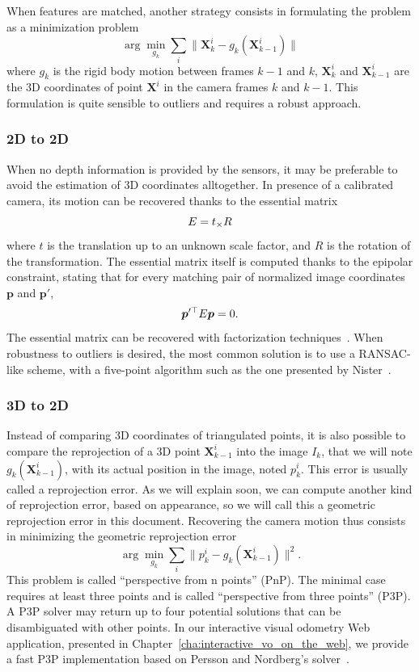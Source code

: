 When features are matched, another strategy consists in
formulating the problem as a minimization problem
\[
	\arg \min_{g_k} \sum_{i} \| \bm{X}_k^i - g_k(\bm{X}_{k-1}^i) \|
\]
where $g_k$ is the rigid body motion between frames $k-1$ and $k$,
$\bm{X}_k^i$ and $\bm{X}_{k-1}^i$ are the 3D coordinates of point $\bm{X}^i$
in the camera frames $k$ and $k-1$.
This formulation is quite sensible to outliers and requires a robust approach.

\subsubsection{2D to 2D}%
\label{ssub:2d_to_2d}

When no depth information is provided by the sensors,
it may be preferable to avoid the estimation of 3D coordinates alltogether.
In presence of a calibrated camera, its motion can be recovered
thanks to the essential matrix
\[
	E = {t}_{\times}R
\]
where $t$ is the translation up to an unknown scale factor,
and $R$ is the rotation of the transformation.
The essential matrix itself is computed thanks to the epipolar constraint,
stating that for every matching pair of normalized image coordinates
$\bm{p}$ and $\bm{p}'$,
\[
	\bm{p}'^{\top}E\bm{p} = 0.
\]
The essential matrix can be recovered with factorization techniques~\cite{longuet1981computer}.
When robustness to outliers is desired,
the most common solution is to use a RANSAC-like scheme,
with a five-point algorithm such as the one presented by Nister~\cite{nister2003efficient}.

\subsubsection{3D to 2D}%
\label{ssub:3d_to_2d}

Instead of comparing 3D coordinates of triangulated points,
it is also possible to compare the reprojection of a 3D point $\bm{X}_{k-1}^i$
into the image $I_k$, that we will note $g_k(\bm{X}_{k-1}^i)$,
with its actual position in the image, noted $p_k^i$.
This error is usually called a reprojection error.
As we will explain soon, we can compute another kind of reprojection error,
based on appearance, so we will call this a geometric reprojection error in this document.
Recovering the camera motion thus consists in minimizing the geometric reprojection error
\[
	\arg \min_{g_k} \sum_i \| p_k^i - g_k(\bm{X}_{k-1}^i) \|^2.
\]
This problem is called ``perspective from n points'' (PnP).
The minimal case requires at least three points and is called
``perspective from three points'' (P3P).
A P3P solver may return up to four potential solutions
that can be disambiguated with other points.
In our interactive visual odometry Web application,
presented in Chapter~\ref{cha:interactive_vo_on_the_web},
we provide a fast P3P implementation based on
Persson and Nordberg's solver~\cite{persson2018lambda}.

